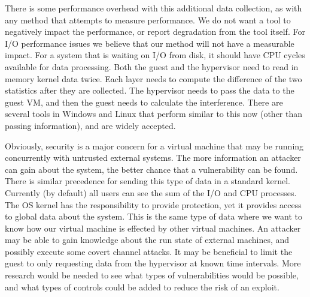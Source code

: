 There is some performance overhead with this additional data collection, as with any method that attempts to measure performance.  We do not want a tool to negatively impact the performance, or report degradation from the tool itself.  For I/O performance issues we believe that our method will not have a measurable impact.  For a system that is waiting on I/O from disk, it should have CPU cycles available for data processing.  Both the guest and the hypervisor need to read in memory kernel data twice.  Each layer needs to compute the difference of the two statistics after they are collected.  The hypervisor needs to pass the data to the guest VM, and then the guest needs to calculate the interference.  There are several tools in Windows and Linux that perform similar to this now (other than passing information), and are widely accepted.

Obviously, security is a major concern for a virtual machine that may be running concurrently with untrusted external systems.  The more information an attacker can gain about the system, the better chance that a vulnerability can be found.  There is similar precedence for sending this type of data in a standard kernel.  Currently (by default) all users can see the sum of the I/O and CPU processes.  The OS kernel has the responsibility to provide protection, yet it provides access to global data about the system.  This is the same type of data where we want to know how our virtual machine is effected by other virtual machines.  An attacker may be able to gain knowledge about the run state of external machines, and possibly execute some covert channel attacks.  It may be beneficial to limit the guest to only requesting data from the hypervisor at known time intervals.  More research would be needed to see what types of vulnerabilities would be possible, and what types of controls could be added to reduce the risk of an exploit.  

